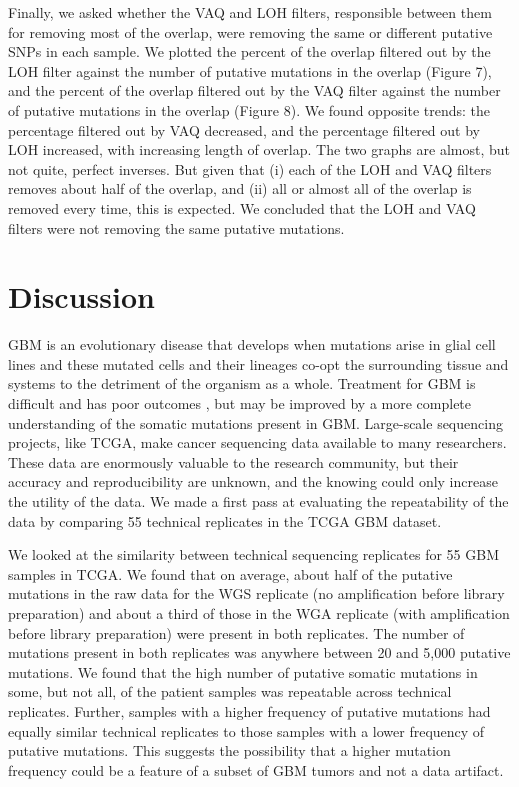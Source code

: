 \documentclass[11pt]{article} %
\begin{document}
Finally, we asked whether the VAQ and LOH filters, responsible between them for removing most of the overlap, were removing the same or different putative SNPs in each sample. We plotted the percent of the overlap filtered out by the LOH filter against the number of putative mutations in the overlap (Figure 7), and the percent of the overlap filtered out by the VAQ filter against the number of putative mutations in the overlap (Figure 8). We found opposite trends: the percentage filtered out by VAQ decreased, and the percentage filtered out by LOH increased, with increasing length of overlap. The two graphs are almost, but not quite, perfect inverses. But given that (i) each of the LOH and VAQ filters removes about half of the overlap, and (ii) all or almost all of the overlap is removed every time, this is expected. We concluded that the LOH and VAQ filters were not removing the same putative mutations. 

\section*{Discussion}

GBM is an evolutionary disease that develops when mutations arise in glial cell lines and these mutated cells and their lineages co-opt the surrounding tissue and systems to the detriment of the organism as a whole. Treatment for GBM is difficult and has poor outcomes \citep{GBM-stats}, but may be improved by a more complete understanding of the somatic mutations present in GBM. Large-scale sequencing projects, like TCGA, make cancer sequencing data available to many researchers. These data are enormously valuable to the research community, but their accuracy and reproducibility are unknown, and the knowing could only increase the utility of the data. We made a first pass at evaluating the repeatability of the data by comparing 55 technical replicates in the TCGA GBM dataset.  

We looked at the similarity between technical sequencing replicates for 55 GBM samples in TCGA. We found that on average, about half of the putative mutations in the raw data for the WGS replicate (no amplification before library preparation) and about a third of those in the WGA replicate (with amplification before library preparation) were present in both replicates. The number of mutations present in both replicates was anywhere between 20 and 5,000 putative mutations. We found that the high number of putative somatic mutations in some, but not all, of the patient samples was repeatable across technical replicates. Further, samples with a higher frequency of putative mutations had equally similar technical replicates to those samples with a lower frequency of putative mutations. This suggests the possibility that a higher mutation frequency could be a feature of a subset of GBM tumors and not a data artifact.
\end{document}
